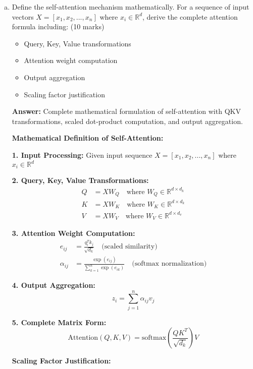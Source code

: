 \documentclass[12pt]{article}
\newcommand{\answer}[1]{{\color{answercolor}\textbf{Answer:} #1}}
\newcommand{\explanation}[1]{{\color{explanationcolor}#1}}
\begin{document}
\begin{center}
\begin{enumerate}[(a)]
    \item Define the self-attention mechanism mathematically. For a sequence of input vectors $X = [x_1, x_2, ..., x_n]$ where $x_i \in \mathbb{R}^d$, derive the complete attention formula including: \hfill (10 marks)
    \begin{itemize}
        \item Query, Key, Value transformations
        \item Attention weight computation
        \item Output aggregation
        \item Scaling factor justification
    \end{itemize}
    
    \answer{Complete mathematical formulation of self-attention with QKV transformations, scaled dot-product computation, and output aggregation.}
    
    \explanation{
    \textbf{Mathematical Definition of Self-Attention:}
    
    \textbf{1. Input Processing:}
    Given input sequence $X = [x_1, x_2, ..., x_n]$ where $x_i \in \mathbb{R}^d$
    
    \textbf{2. Query, Key, Value Transformations:}
    \begin{align}
        Q &= XW_Q \quad \text{where } W_Q \in \mathbb{R}^{d \times d_k} \\
        K &= XW_K \quad \text{where } W_K \in \mathbb{R}^{d \times d_k} \\
        V &= XW_V \quad \text{where } W_V \in \mathbb{R}^{d \times d_v}
    \end{align}
    
    \textbf{3. Attention Weight Computation:}
    \begin{align}
        e_{ij} &= \frac{q_i^T k_j}{\sqrt{d_k}} \quad \text{(scaled similarity)} \\
        \alpha_{ij} &= \frac{\exp(e_{ij})}{\sum_{k=1}^n \exp(e_{ik})} \quad \text{(softmax normalization)}
    \end{align}
    
    \textbf{4. Output Aggregation:}
    $$z_i = \sum_{j=1}^n \alpha_{ij} v_j$$
    
    \textbf{5. Complete Matrix Form:}
    $$\text{Attention}(Q, K, V) = \text{softmax}\left(\frac{QK^T}{\sqrt{d_k}}\right)V$$
    
    \textbf{Scaling Factor Justification:}
    
}
\end{enumerate}
\end{center}
\end{document}
